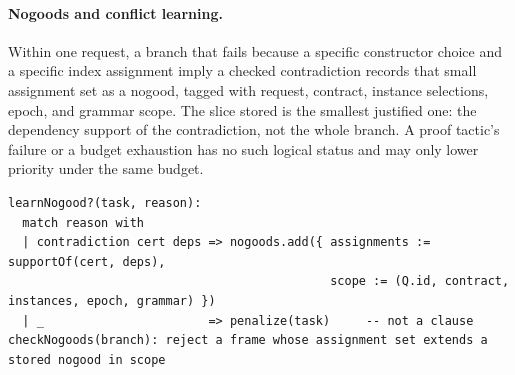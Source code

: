 \paragraph{Nogoods and conflict learning.} Within one request, a branch that fails because a specific constructor choice and a specific index assignment imply a checked contradiction records that small assignment set as a nogood, tagged with request, contract, instance selections, epoch, and grammar scope. The slice stored is the smallest justified one: the dependency support of the contradiction, not the whole branch. A proof tactic's failure or a budget exhaustion has no such logical status and may only lower priority under the same budget.
\begin{lstlisting}
learnNogood?(task, reason):
  match reason with
  | contradiction cert deps => nogoods.add({ assignments := supportOf(cert, deps),
                                             scope := (Q.id, contract, instances, epoch, grammar) })
  | _                       => penalize(task)     -- not a clause
checkNogoods(branch): reject a frame whose assignment set extends a stored nogood in scope
\end{lstlisting}

